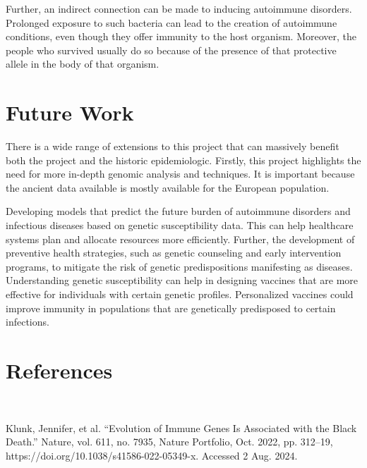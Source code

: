 \documentclass[a4paper, 12pt]{article}
\begin{document}
Further, an indirect connection can be made to inducing autoimmune disorders. Prolonged exposure to such bacteria can lead to the creation of autoimmune conditions, even though they offer immunity to the host organism. Moreover, the people who survived usually do so because of the presence of that protective allele in the body of that organism. 
 
\section{Future Work}
There is a wide range of extensions to this project that can massively benefit both the project and the historic epidemiologic. Firstly, this project highlights the need for more in-depth genomic analysis and techniques. It is important because the ancient data available is mostly available for the European population. 

Developing models that predict the future burden of autoimmune disorders and infectious diseases based on genetic susceptibility data. This can help healthcare systems plan and allocate resources more efficiently. Further, the development of preventive health strategies, such as genetic counseling and early intervention programs, to mitigate the risk of genetic predispositions manifesting as diseases.
Understanding genetic susceptibility can help in designing vaccines that are more effective for individuals with certain genetic profiles. Personalized vaccines could improve immunity in populations that are genetically predisposed to certain infections.


\section{References}‌



Klunk, Jennifer, et al. “Evolution of Immune Genes Is Associated with the Black Death.” Nature, vol. 611, no. 7935, Nature Portfolio, Oct. 2022, pp. 312–19, https://doi.org/10.1038/s41586-022-05349-x. Accessed 2 Aug. 2024.
\end{document}
